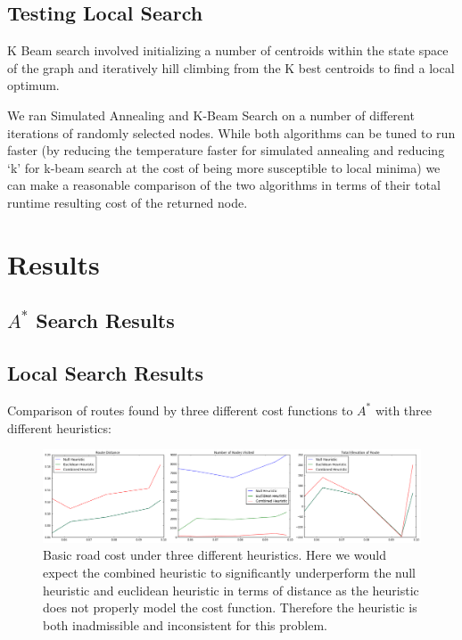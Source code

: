 \documentclass[11pt]{article}
\begin{document}

\subsection{Testing Local Search}

\par
K Beam search involved initializing a number of centroids within the state space of the graph and iteratively hill climbing from the K best centroids to find a local optimum.
\par
We ran Simulated Annealing and K-Beam Search on a number of different iterations of randomly selected nodes. While both algorithms can be tuned to run faster (by reducing the temperature faster for simulated annealing and reducing `k' for k-beam search at the cost of being more susceptible to local minima) we can make a reasonable comparison of the two algorithms in terms of their total runtime resulting cost of the returned node.

\section{Results}\label{results}

\subsection{$A^{*}$ Search Results}

\subsection{Local Search Results}

Comparison of routes found by three different cost functions to $A^{*}$ with three different heuristics: \\

\begin{figure}[H]
\caption{Basic road cost under three different heuristics. Here we would expect the combined heuristic to significantly underperform the null heuristic and euclidean heuristic in terms of distance as the heuristic does not properly model the cost function. Therefore the heuristic is both inadmissible and inconsistent for this problem. }
\includegraphics[width=1\textwidth]{../images/cost_1.png}
\end{figure}
\end{document}
